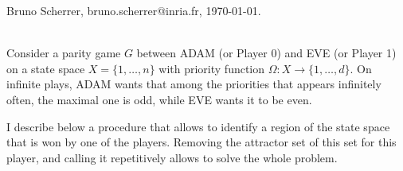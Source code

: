 \documentclass{article}
\begin{document}
\noindent Bruno Scherrer, bruno.scherrer@inria.fr, \today.

~\\

Consider a parity game $G$ between ADAM (or Player 0) and EVE (or Player 1) on a state space $X=\{1,\dots,n\}$ with priority function $\Omega:X \to \{1,\dots,d\}$. On infinite plays, ADAM wants that among the priorities that appears infinitely often, the maximal one is odd, while EVE wants it to be even.

I describe below a procedure that allows to identify a region of the state space that is won by one of the players. Removing the attractor set of this set for this player, and calling it repetitively allows to solve the whole problem.

~\\
\end{document}
